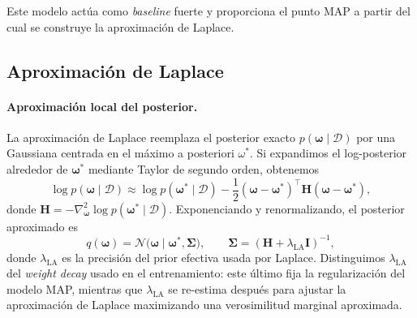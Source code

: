 \documentclass{article}
\begin{document}
Este modelo act\'ua como \emph{baseline} fuerte y proporciona el punto
MAP a partir del cual se construye la aproximaci\'on de Laplace.

\subsection{Aproximaci\'on de Laplace}
\label{sec:laplace-method}

\paragraph{Aproximaci\'on local del posterior.}
La aproximaci\'on de Laplace reemplaza el posterior exacto
\(p(\boldsymbol{\omega}\mid\mathcal{D})\) por una Gaussiana centrada en
el m\'aximo a posteriori \(\omega^*\). Si expandimos el log-posterior alrededor de
\(\boldsymbol{\omega}^{*}\) mediante Taylor de segundo orden, obtenemos
\begin{equation}
\log p(\boldsymbol{\omega}\mid\mathcal{D})
\approx
\log p(\boldsymbol{\omega}^{*}\mid\mathcal{D})
-
\frac{1}{2}
(\boldsymbol{\omega}-\boldsymbol{\omega}^{*})^{\top}
\mathbf{H}
(\boldsymbol{\omega}-\boldsymbol{\omega}^{*}),
\label{eq:laplace-taylor}
\end{equation}
donde
\(
\mathbf{H}
=
-\nabla^2_{\boldsymbol{\omega}}
\log p(\boldsymbol{\omega}^{*}\mid\mathcal{D})
\).
Exponenciando y renormalizando, el posterior aproximado es
\begin{equation}
q(\boldsymbol{\omega})
=
\mathcal{N}
\bigl(
\boldsymbol{\omega}\mid
\boldsymbol{\omega}^{*},
\mathbf{\Sigma}
\bigr),
\qquad
\mathbf{\Sigma}
=
(\mathbf{H}+\lambda_{\mathrm{LA}}\mathbf{I})^{-1},
\label{eq:laplace-posterior}
\end{equation}
donde \(\lambda_{\mathrm{LA}}\) es la precisi\'on del prior efectiva
usada por Laplace. Distinguimos \(\lambda_{\mathrm{LA}}\) del \emph{weight decay} usado en el
entrenamiento: este \'ultimo fija la regularizaci\'on del modelo MAP,
mientras que \(\lambda_{\mathrm{LA}}\) se re-estima despu\'es para ajustar
la aproximaci\'on de Laplace maximizando una verosimilitud marginal
aproximada.
\end{document}
